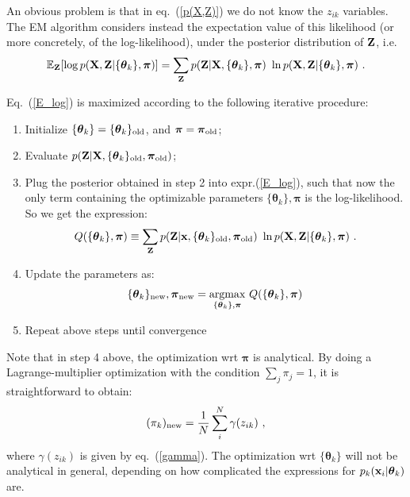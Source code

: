 \documentclass[12pt, a4paper]{article}
\newcommand{\bx}{{\bf x}}
\newcommand{\btheta}{\boldsymbol{\theta}}
\begin{document}
An obvious problem is that in eq.~(\ref{p(X,Z)}) we do not know the $z_{ik}$ variables. The EM algorithm considers instead the expectation value of this likelihood (or more concretely, of the log-likelihood), under the posterior distribution of ${\bf Z}$, i.e.
\begin{equation}
\label{E_log}
\mathbb{E}_{\bf Z} 
[\log p({\bf X,Z}|\{\btheta_k\},\boldsymbol{\pi}) ] =
\sum_{\bf Z} 
p({\bf Z}|{\bf X},\{\btheta_k\},\boldsymbol{\pi})~
\ln p({\bf X,Z}|\{\btheta_k\},\boldsymbol{\pi})~.
\end{equation}

Eq.~(\ref{E_log}) is maximized according to the following iterative procedure:
\begin{enumerate}
    \item Initialize $\{\btheta_k\}=\{\btheta_k\}_{\rm old}$, and $\boldsymbol{\pi} = \boldsymbol{\pi}_{\rm old}$;
    \item Evaluate $p({\bf Z}|{\bf X},\{\btheta_k\}_{\rm old},\boldsymbol{\pi}_{\rm old})$;
    \item Plug the posterior obtained in step 2 into expr.(\ref{E_log}), such that now the only term containing the optimizable parameters $\{\btheta_k\},\boldsymbol{\pi}$ is the log-likelihood. So we get the expression:
    \begin{equation}
      Q(\{\btheta_k\},\boldsymbol{\pi}) \equiv
     \sum_{\bf Z} 
    p({\bf Z}|\bx,\{\btheta_k\}_{\rm old},\boldsymbol{\pi}_{\rm old})~
\ln p({\bf X,Z}|\{\btheta_k\},\boldsymbol{\pi})~.  
    \end{equation}
    \item Update the parameters as:
    \begin{equation}
      \{\btheta_k\}_{\rm new},\boldsymbol{\pi}_{\rm new} =
      \underset{\{\btheta_k\},\boldsymbol{\pi}}
      {\rm argmax}~Q(\{\btheta_k\},\boldsymbol{\pi})
    \end{equation}
    \item Repeat above steps until convergence
\end{enumerate}
Note that in step 4 above, the optimization wrt $\boldsymbol{\pi}$ is analytical. By doing a Lagrange-multiplier optimization with the condition $\sum_j \pi_j = 1$, it is straightforward to obtain:
\begin{equation}
    (\pi_k)_{\rm new} = \frac{1}{N}\sum_i^N \gamma(z_{ik})~,
\end{equation}
where $\gamma(z_{ik})$ is given by eq.~(\ref{gamma}). The optimization wrt $\{\btheta_k\}$ will not be analytical in general, depending on how complicated the expressions for $p_k(\bx_i|\btheta_k)$ are.
\end{document}
